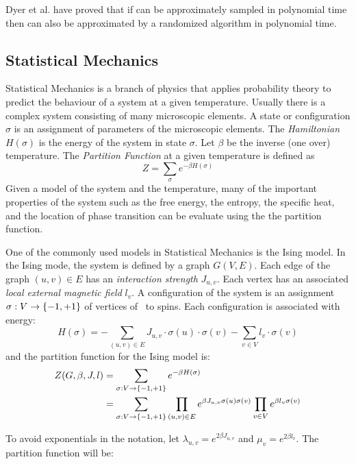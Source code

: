 Dyer et al. \cite{Sampling} have proved that if  can be approximately 
sampled in polynomial time then  
can also be approximated by a randomized algorithm in polynomial time. 

\subsection*{Statistical Mechanics}
Statistical Mechanics is a branch of physics that applies probability theory to
predict the behaviour of a system at a given temperature. Usually there is a complex system
consisting of many microscopic elements. A state or configuration \(\sigma\) is an assignment of
parameters of the microscopic elements. 
The \emph{Hamiltonian} \(H(\sigma)\) is the energy of the system in state \(\sigma\)\@. 
Let \(\beta\) be the inverse (one over) temperature. 
The \emph{Partition Function} at a given temperature is defined as
\[Z=\sum_\sigma e^{-\beta H(\sigma)}\]
Given a model of the system and the temperature,
many of the important properties of the system such as the free energy, the entropy, the specific heat, and the location of phase transition can be evaluate using the the partition function.

One of the commonly used models in Statistical Mechanics is the Ising model. In the Ising mode,
the system is defined by a graph \(G(V,E)\)\@.
Each edge of the graph \((u,v)\in E\) has an {\em interaction strength} \(J_{u,v}\)\@. Each
vertex has an associated \emph{local external magnetic field} \(l_v\)\@.
A configuration of the system  is an assignment \(\sigma: V\to \{{-1,+1}\}\) of vertices of \mG\
to spins. Each configuration is associated with energy:
\[H(\sigma)=-\sum_{(u,v)\in E}J_{u,v}\cdot\sigma(u)\cdot\sigma(v)-\sum_{v\in V} l_v\cdot\sigma(v)\]
and the partition function for the Ising model is:
\begin{align*}
Z(G,\beta,J,l)&=\sum_{\sigma:V\to\{{-1,+1}\}}e^{-\beta H(\sigma)}\\
&=\sum_{\sigma:V\to\{{-1,+1}\}} \prod_{(u,v)\in E}
e^{\beta J_{u,v}\sigma(u)\sigma(v)} \prod_{v\in V} 
e^{\beta l_v\sigma(v)}
\end{align*}

To avoid exponentials in the notation, let \(\lambda_{u,v}=e^{2\beta J_{u,v}}\) and 
\(\mu_{v}=e^{2\beta l_v}\). The partition function will be:

